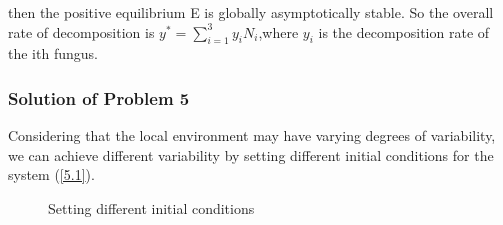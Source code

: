 then the positive equilibrium E is globally asymptotically stable. So the overall rate of decomposition is $y^*=\sum_{i = 1}^{3}y_{i}N_{i}$,where $y_{i}$ is the decomposition rate of the ith fungus.

\subsubsection{Solution of Problem 5}
Considering that the local environment may have varying degrees of variability, we can achieve different variability by setting different initial conditions for the system (\ref{5.1}).
\begin{figure}[H]
    \centering
    \caption{Setting different initial conditions}
    \label{fig9} 
\end{figure}

